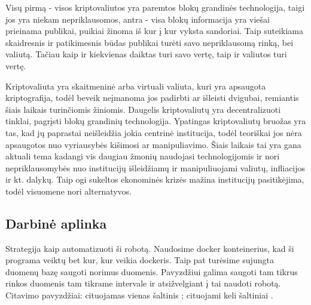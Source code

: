 \documentclass{VUMIFInfKursinis}
\begin{document}
Visų pirmą - visos kriptovaliutos yra paremtos blokų grandinės technologija, taigi jos yra
niekam nepriklausomos, antra - visa blokų informacija yra viešai prieinama publikai, puikiai žinoma iš kur į kur vyksta sandoriai. 
Taip suteikiama skaidresnis ir patikimesnis būdas publikai turėti savo nepriklausomą rinką, bei valiutą. 
Tačiau kaip ir kiekvienas daiktas turi savo vertę, taip ir valiutos turi vertę.

Kriptovaliuta yra skaitmeninė arba virtuali valiuta, kuri yra apsaugota kriptografija, todėl beveik neįmanoma jos padirbti ar išleisti dvigubai, remiantis šiais laikais turinčiomis
žiniomis. Daugelis kriptovaliutų yra decentralizuoti tinklai, pagrįsti blokų grandinių technologija. Ypatingas kriptovaliutų bruožas yra tas, kad jų paprastai neišleidžia
jokia centrinė institucija, todėl teoriškai jos nėra apsaugotos nuo vyriausybės kišimosi ar manipuliavimo. Šiais laikais tai yra gana aktuali tema kadangi vis daugiau žmonių 
naudojasi technologijomis ir nori nepriklausomybės nuo institucijų išleidžiamų ir manipuliuojami valiutų, infliacijos ir kt. dalykų. Taip ogi sukeltos ekonominės krizės mažina
institucijų pasitikėjima, todėl visuomene nori alternatyvos.



\subsection{Darbinė aplinka}
Strategija kaip automatizuoti ši robotą. Naudosime docker konteinerius, kad ši programa veiktų bet kur, kur veikia dockeris. Taip pat turėsime sujungta duomenų bazę
saugoti norimus duomenis. Pavyzdžiui galima saugoti tam tikrus rinkos duomenis tam tikrame intervale ir atsižvelgiant į tai naudoti robotą. 
Citavimo pavyzdžiai: cituojamas vienas šaltinis \cite{PvzStraipsnLt}; cituojami
keli šaltiniai \cite{PvzStraipsnEn, PvzKonfLt, PvzKonfEn, PvzKnygLt, PvzKnygEn,
  PvzElPubLt, PvzElPubEn, PvzMagistrLt, PvzPhdEn}.
\end{document}
